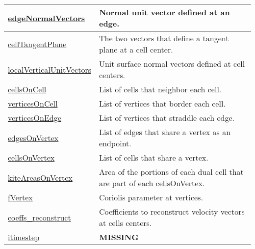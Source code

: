 {\begin{center}
\begin{longtable}{| p{2.0in} | p{4.0in} |}
    \hline
    \hyperref[subsec:var_sec_mesh_edgeNormalVectors]{edgeNormalVectors} & Normal unit vector defined at an edge. \\
    \hline
    \hyperref[subsec:var_sec_mesh_cellTangentPlane]{cellTangentPlane} & The two vectors that define a tangent plane at a cell center. \\
    \hline
    \hyperref[subsec:var_sec_mesh_localVerticalUnitVectors]{localVerticalUnitVectors} & Unit surface normal vectors defined at cell centers. \\
    \hline
    \hyperref[subsec:var_sec_mesh_cellsOnCell]{cellsOnCell} & List of cells that neighbor each cell. \\
    \hline
    \hyperref[subsec:var_sec_mesh_verticesOnCell]{verticesOnCell} & List of vertices that border each cell. \\
    \hline
    \hyperref[subsec:var_sec_mesh_verticesOnEdge]{verticesOnEdge} & List of vertices that straddle each edge. \\
    \hline
    \hyperref[subsec:var_sec_mesh_edgesOnVertex]{edgesOnVertex} & List of edges that share a vertex as an endpoint. \\
    \hline
    \hyperref[subsec:var_sec_mesh_cellsOnVertex]{cellsOnVertex} & List of cells that share a vertex. \\
    \hline
    \hyperref[subsec:var_sec_mesh_kiteAreasOnVertex]{kiteAreasOnVertex} & Area of the portions of each dual cell that are part of each cellsOnVertex. \\
    \hline
    \hyperref[subsec:var_sec_mesh_fVertex]{fVertex} & Coriolis parameter at vertices. \\
    \hline
    \hyperref[subsec:var_sec_mesh_coeffs_reconstruct]{coeffs\_reconstruct} & Coefficients to reconstruct velocity vectors at cells centers. \\
    \hline
    \hyperref[subsec:var_sec_mesh_itimestep]{itimestep} & {\bf \color{red} MISSING} \\
    \hline
\end{longtable}
\end{center}
}
